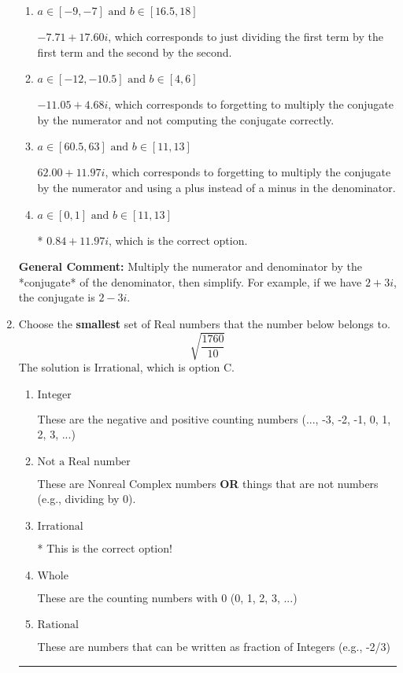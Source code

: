\documentclass{extbook}[14pt]
\newcommand{\litem}[1]{\item #1

\rule{\textwidth}{0.4pt}}
\begin{document}
\begin{enumerate}
{\begin{enumerate}[label=\Alph*.]
 $0.84  + 886.00 i$, which corresponds to forgetting to multiply the conjugate by the numerator.
\item \( a \in [-9, -7] \text{ and } b \in [16.5, 18] \)

 $-7.71  + 17.60 i$, which corresponds to just dividing the first term by the first term and the second by the second.
\item \( a \in [-12, -10.5] \text{ and } b \in [4, 6] \)

 $-11.05  + 4.68 i$, which corresponds to forgetting to multiply the conjugate by the numerator and not computing the conjugate correctly.
\item \( a \in [60.5, 63] \text{ and } b \in [11, 13] \)

 $62.00  + 11.97 i$, which corresponds to forgetting to multiply the conjugate by the numerator and using a plus instead of a minus in the denominator.
\item \( a \in [0, 1] \text{ and } b \in [11, 13] \)

* $0.84  + 11.97 i$, which is the correct option.
\end{enumerate}

\textbf{General Comment:} Multiply the numerator and denominator by the *conjugate* of the denominator, then simplify. For example, if we have $2+3i$, the conjugate is $2-3i$.
}
\litem{
Choose the \textbf{smallest} set of Real numbers that the number below belongs to.
\[ \sqrt{\frac{1760}{10}} \]The solution is \( \text{Irrational} \), which is option C.\begin{enumerate}[label=\Alph*.]
\item \( \text{Integer} \)

These are the negative and positive counting numbers (..., -3, -2, -1, 0, 1, 2, 3, ...)
\item \( \text{Not a Real number} \)

These are Nonreal Complex numbers \textbf{OR} things that are not numbers (e.g., dividing by 0).
\item \( \text{Irrational} \)

* This is the correct option!
\item \( \text{Whole} \)

These are the counting numbers with 0 (0, 1, 2, 3, ...)
\item \( \text{Rational} \)

These are numbers that can be written as fraction of Integers (e.g., -2/3)
\end{enumerate}

}
\end{enumerate}
\end{document}
